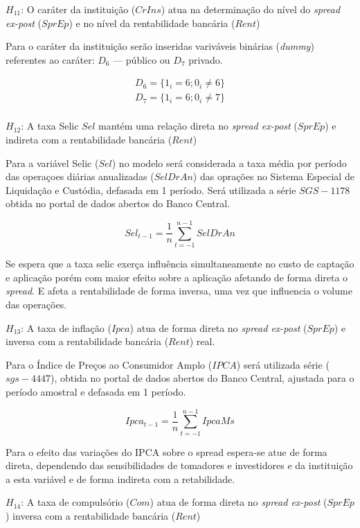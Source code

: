 \documentclass[12pt,12pt,openright,oneside,a4paper,chapter=TITLE,section=TITLE,subsection=TITLE,subsubsection=TITLE english,french,spanish,portugues,sumario=tradicional]{abntex2}
\begin{document}
\(H_11\): O caráter da instituição (\(CrIns\)) atua na determinação do nível do
\emph{spread ex-post} (\(SprEp\)) e no nível da rentabilidade bancária (\(Rent\))

Para o caráter da instituição serão inseridas variváveis binárias (\emph{dummy}) referentes ao caráter: \(D_{6}\) --- público ou \(D_{7}\) privado.

\[\begin{aligned}
D_{6} = \lbrace 1_{i} = 6 ; 0_{i} \neq 6 \rbrace \\
D_{7} = \lbrace 1_{i} = 6 ; 0_{i} \neq 7 \rbrace \\
\end{aligned}\]

\(H_12\): A taxa Selic \(Sel\) mantém uma relação direta no \emph{spread ex-post} (\(SprEp\)) e indireta com a rentabilidade bancária (\(Rent\))

Para a variável Selic (\(Sel\)) no modelo será considerada a taxa média por período das operaçoes diárias anualizadas (\(SelDrAn\)) das oprações no Sistema Especial de Liquidação e Custódia, defasada em 1 período. Será utilizada a série \(SGS-1178\) obtida no portal de dados abertos do Banco Central.

\[
Sel_{t-1} = \frac{1}{n}\sum_{t=-1}^{n-1}SelDrAn
\]

Se espera que a taxa selic exerça influência simultaneamente no custo de captação e aplicação porém com maior efeito sobre a aplicação afetando de forma direta o \emph{spread}. E afeta a rentabilidade de forma inversa, uma vez que influencia o volume das operações.

\(H_13\): A taxa de inflação (\(Ipca\)) atua de forma direta no \emph{spread ex-post} (\(SprEp\)) e inversa com a rentabilidade bancária (\(Rent\)) real.

Para o Índice de Preços ao Consumidor Amplo (\(IPCA\)) será utilizada série (\(sgs-4447\)), obtida no portal de dados abertos do Banco Central, ajustada para o período amostral e defasada em 1 período.

\[
Ipca_{t-1} = \frac{1}{n}\sum_{t=-1}^{n-1}IpcaMs
\]

Para o efeito das variações do IPCA sobre o spread espera-se atue de forma direta, dependendo das sensibilidades de tomadores e investidores e da instituição a esta variável e de forma indireta com a retabilidade.

\(H_14\): A taxa de compulsório (\(Com\)) atua de forma direta no \emph{spread ex-post} (\(SprEp\)) inversa com a rentabilidade bancária (\(Rent\))
\end{document}
